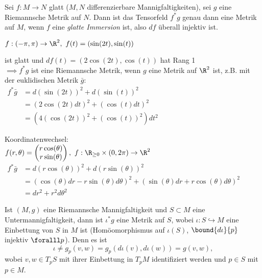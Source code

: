 \begin{lem}\lecture 
	Sei $ f: M \to N $ glatt ($M,N$ differenzierbare Mannigfaltigkeiten), sei $g$ eine Riemannsche Metrik auf $N$. Dann ist das Tensorfeld $ f^*g $ genau dann eine Metrik auf $M$, wenn $f$ eine \emph{glatte Immersion} ist, also $df$ überall injektiv ist.
\end{lem}

\begin{exmp*}
	$ f:(-\pi,\pi)\to \R^2,\ f(t) = (\sin(2t),\sin(t)) $\\
	\begin{minipage}{\linewidth}
		\begin{wrapfigure}{l}{0.1\textwidth}
		\end{wrapfigure}
		ist glatt und $ df(t) = (2\cos(2t),\cos(t)) $ hat Rang 1\\
		$\implies f^*g$ ist eine Riemannsche Metrik, wenn $g$ eine Metrik auf $\R^2$ ist, z.B. mit der euklidischen Metrik $\bar{g}$:\\
		$\begin{aligned}
			f^*\bar{g} &= d(\sin(2t))^2 + d(\sin(t))^2\\
			&= (2\cos(2t)dt)^2 + (\cos(t)dt)^2\\
			&= (4(\cos(2t))^2 + (\cos(t))^2)dt^2
		\end{aligned}$
	\end{minipage}
\end{exmp*}

\begin{exmp*}
	Koordinatenwechsel:\\
	$ f(r,\theta) = \begin{pmatrix}
		r\cos(\theta)\\r\sin(\theta)
	\end{pmatrix} ,\ f: \R_{\geq 0} \times (0,2\pi) \to \R^2$\\
	$ \begin{aligned}
		f^*\bar{g} &= d(r\cos(\theta))^2 + d(r\sin(\theta))^2\\
		&= (\cos(\theta)dr - r\sin(\theta)d\theta)^2 + (\sin(\theta)dr + r\cos(\theta)d\theta)^2\\
		&= dr^2 + r^2d\theta^2
	\end{aligned} $
\end{exmp*}

\begin{defn*}
	Ist $ (M,g) $ eine Riemannsche Mannigfaltigkeit und $S \subset M$ eine Untermannigfaltigkeit, dann ist $\iota^*g$ eine Metrik auf $S$, wobei $\iota: S \hookrightarrow M$ eine Einbettung von $S$ in $M$ ist (Homöomorphismus auf $\iota(S)$, $\bound{d\iota}{p}$ injektiv $\foralll p$). Denn es ist
	\[ \iota \neq g_p(v,w) = g_p(d\iota(v),d\iota(w)) = g(v,w), \]
	wobei $v,w \in T_pS$ mit ihrer Einbettung in $T_pM$ identifiziert werden und $p \in S$ mit $p \in M$.
\end{defn*}


